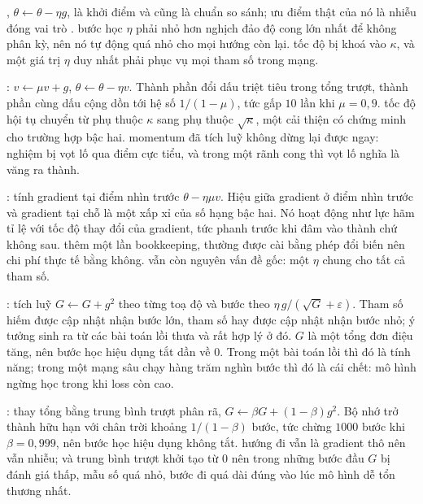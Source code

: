 \documentclass[../../../deep_learning.tex]{subfiles}
\begin{document}
\begin{mach}
\item {} \gp {}, \(\theta \leftarrow \theta - \eta g\), là khởi điểm và cũng là chuẩn so sánh; ưu điểm thật của nó là nhiễu  đóng vai trò . \gia bước học \(\eta\) phải nhỏ hơn nghịch đảo độ cong lớn nhất để không phân kỳ, nên nó tự động quá nhỏ cho mọi hướng còn lại. \vdm tốc độ bị khoá vào \(\kappa\), và một giá trị \(\eta\) duy nhất phải phục vụ mọi tham số trong mạng.
\item {} \gp {}: \(v \leftarrow \mu v + g\), \(\theta \leftarrow \theta - \eta v\). Thành phần đổi dấu triệt tiêu trong tổng trượt, thành phần cùng dấu cộng dồn tới hệ số \(1/(1-\mu)\), tức gấp \(10\) lần khi \(\mu = 0{,}9\). \hq tốc độ hội tụ chuyển từ phụ thuộc \(\kappa\) sang phụ thuộc \(\sqrt{\kappa}\), một cải thiện có chứng minh cho trường hợp bậc hai. \vdm momentum đã tích luỹ không dừng lại được ngay: nghiệm bị vọt lố qua điểm cực tiểu, và trong một rãnh cong thì vọt lố nghĩa là văng ra thành.
\item {} \gp {}: tính gradient tại điểm nhìn trước \(\theta - \eta\mu v\). Hiệu giữa gradient ở điểm nhìn trước và gradient tại chỗ là một xấp xỉ của số hạng bậc hai. Nó hoạt động như lực hãm tỉ lệ với tốc độ thay đổi của gradient, tức phanh trước khi đâm vào thành chứ không sau. \gia thêm một lần bookkeeping, thường được cài bằng phép đổi biến nên chi phí thực tế bằng không. \vdm vẫn còn nguyên vấn đề gốc: một \(\eta\) chung cho tất cả tham số.
\item {} \gp {}: tích luỹ \(G \leftarrow G + g^2\) theo từng toạ độ và bước theo \(\eta\, g/(\sqrt{G}+\varepsilon)\). Tham số hiếm được cập nhật nhận bước lớn, tham số hay được cập nhật nhận bước nhỏ; ý tưởng sinh ra từ các bài toán lồi thưa và rất hợp lý ở đó. \vdm \(G\) là một tổng đơn điệu tăng, nên bước học hiệu dụng tắt dần về \(0\). Trong một bài toán lồi thì đó là tính năng; trong một mạng sâu chạy hàng trăm nghìn bước thì đó là cái chết: mô hình ngừng học trong khi loss còn cao.
\item {} \gp {}: thay tổng bằng trung bình trượt phân rã, \(G \leftarrow \beta G + (1-\beta)g^2\). Bộ nhớ trở thành hữu hạn với chân trời khoảng \(1/(1-\beta)\) bước, tức chừng \(1000\) bước khi \(\beta = 0{,}999\), nên bước học hiệu dụng không tắt. \vdm hướng đi vẫn là gradient thô nên vẫn nhiễu; và trung bình trượt khởi tạo từ \(0\) nên trong những bước đầu \(G\) bị đánh giá thấp, mẫu số quá nhỏ, bước đi quá dài đúng vào lúc mô hình dễ tổn thương nhất.

\end{mach}
\end{document}
